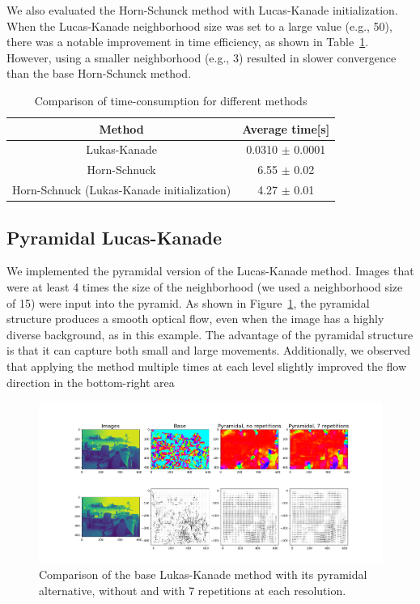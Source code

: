 \documentclass[9pt]{IEEEtran}
\begin{document}
We also evaluated the Horn-Schunck method with Lucas-Kanade initialization. When the Lucas-Kanade 
neighborhood size was set to a large value (e.g., 50), there was a notable improvement in time efficiency, 
as shown in Table~\ref{tab:time}. However, using a smaller neighborhood (e.g., 3) resulted in slower 
convergence than the base Horn-Schunck method.
\begin{table}[h]
    \centering
    \begin{tabular}{c|c}
        \textbf{Method} & \textbf{Average time[s]} \\
        \hline
        Lukas-Kanade & 0.0310 $\pm$ 0.0001 \\
        Horn-Schnuck & 6.55 $\pm$ 0.02\\
        Horn-Schnuck (Lukas-Kanade initialization) & 4.27 $\pm$ 0.01  \\
    \end{tabular}
    \caption{Comparison of time-consumption for different methods}
    \label{tab:time}
\end{table}

\subsection{Pyramidal Lucas-Kanade}
We implemented the pyramidal version of the Lucas-Kanade method. Images that were at least 4 times 
the size of the neighborhood (we used a neighborhood size of 15) were input into the pyramid.
As shown in Figure~\ref{fig:pyramidal}, the pyramidal structure produces a smooth optical flow, 
even when the image has a highly diverse background, as in this example. The advantage of the pyramidal
 structure is that it can capture both small and large movements. Additionally, we observed that applying 
 the method multiple times at each level slightly improved the flow direction in the bottom-right area

\begin{figure}[h]
    \centering
    \includegraphics[width=1\columnwidth]{figures/Pyramidal.png}
    \caption{Comparison of the base Lukas-Kanade method with its pyramidal alternative, without and with 7 repetitions at each resolution.}
    \label{fig:pyramidal}
\end{figure}
\end{document}
